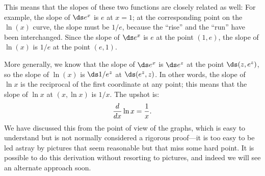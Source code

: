 \noindent 
This means that the slopes of these two functions are closely related
as well: For example, the slope of $\ds e^x$ is $e$ at $x=1$; at the
corresponding point on the $\ln(x)$ curve, the slope must be $1/e$,
because the ``rise'' and the ``run'' have been interchanged. Since the
slope of $\ds e^x$ is $e$ at the point $(1,e)$, the slope of $\ln(x)$ is
$1/e$ at the point $(e,1)$.


More generally, we know that the slope of $\ds e^x$ is $\ds e^z$ at the point
$\ds (z,e^z)$, so the slope of $\ln(x)$ is $\ds 1/e^z$ at $\ds (e^z,z)$.
In other words, the slope of $\ln x$ is the reciprocal of the first
coordinate at any point; this means that the slope of $\ln x$ at
$(x,\ln x)$ is $1/x$. The upshot is:
$${d\over dx}\ln x = {1\over x}.$$
We have discussed this from the point of view of the graphs, which is
easy to understand but is not normally considered a rigorous
proof---it is too easy to be led astray by pictures that seem
reasonable but that miss some hard point. It is possible to do this
derivation without resorting to pictures, and indeed we will see an
alternate approach soon.

